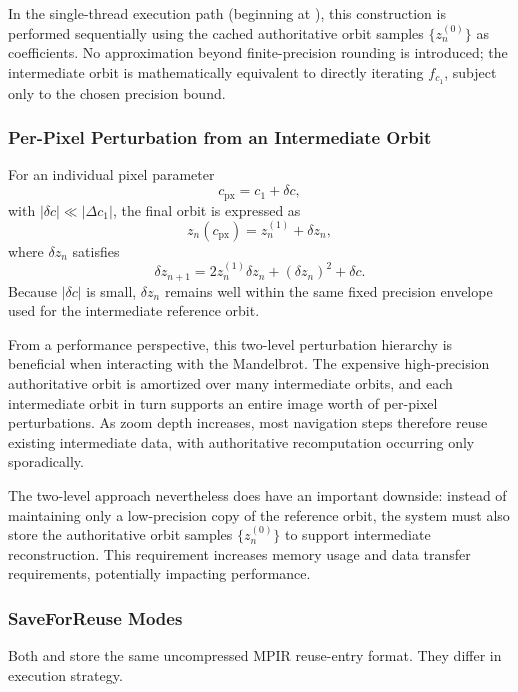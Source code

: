 In the single-thread execution path (beginning at
), this construction is performed
sequentially using the cached authoritative
orbit samples $\{z^{(0)}_n\}$ as coefficients.
No approximation beyond finite-precision rounding is introduced; the intermediate orbit is mathematically equivalent
to directly iterating $f_{c_1}$, subject only to the chosen precision bound.

\subsubsection{Per-Pixel Perturbation from an Intermediate Orbit}

For an individual pixel parameter
\[
c_{\text{px}} = c_1 + \delta c,
\]
with $|\delta c| \ll |\Delta c_1|$, the final orbit is expressed as
\[
z_n(c_{\text{px}}) = z^{(1)}_n + \delta z_n,
\]
where $\delta z_n$ satisfies
\begin{equation}
\delta z_{n+1}
= 2 z^{(1)}_n \delta z_n
  + (\delta z_n)^2
  + \delta c.
\label{eq:pixel_perturbation}
\end{equation}
Because $|\delta c|$ is small, $\delta z_n$ remains well within the same fixed precision envelope used for the
intermediate reference orbit.

From a performance perspective, this two-level perturbation hierarchy is
beneficial when interacting with the Mandelbrot. The expensive high-precision
authoritative orbit is amortized over many intermediate orbits, and each
intermediate orbit in turn supports an entire image worth of per-pixel
perturbations. As zoom depth increases, most navigation steps therefore reuse
existing intermediate data, with authoritative recomputation occurring only
sporadically.

The two-level approach nevertheless does have an important downside: instead of
maintaining only a low-precision copy of the reference orbit, the system must also
store the authoritative orbit samples $\{z^{(0)}_n\}$ to support intermediate
reconstruction.  This requirement increases memory usage and data transfer requirements,
potentially impacting performance.

\subsubsection{SaveForReuse Modes}

Both  and  store the same uncompressed
MPIR reuse-entry format.  They differ in execution strategy.

